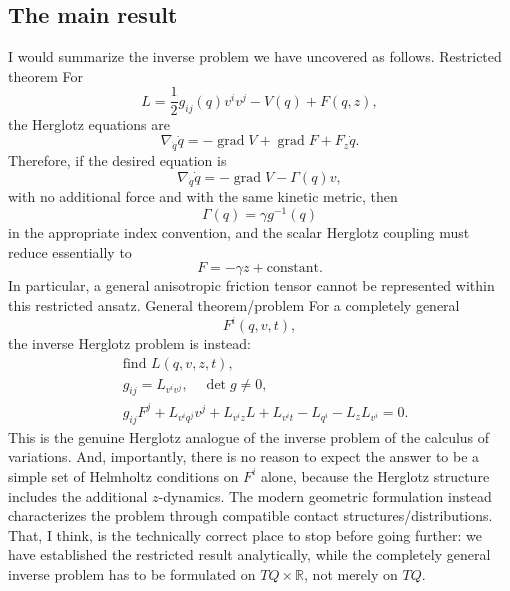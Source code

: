 \subsection{The main result}

I would summarize the inverse problem we have uncovered as follows.
Restricted theorem
For
$$ L= \frac12g_{ij}(q)v^iv^j-V(q)+F(q,z), $$
the Herglotz equations are
\begin{equation}
 \nabla_{\dot q}\dot q = -\operatorname{grad}V + \operatorname{grad}F + F_z\dot q. \tag{50} 
\end{equation}
Therefore, if the desired equation is
\begin{equation}
 \nabla_{\dot q}\dot q = -\operatorname{grad}V - \Gamma(q)v, \tag{51} 
\end{equation}
with no additional force and with the same kinetic metric, then
$$ \boxed{ \Gamma(q)=\gamma g^{-1}(q) } $$
in the appropriate index convention, and the scalar Herglotz coupling must reduce essentially to
$$ F=-\gamma z+\text{constant}. $$
In particular, a general anisotropic friction tensor cannot be represented within this restricted ansatz.
General theorem/problem
For a completely general
$$ F^i(q,v,t), $$
the inverse Herglotz problem is instead:
\begin{equation}
 \boxed{ \begin{aligned} &\text{find }L(q,v,z,t),\\ &g_{ij}=L_{v^iv^j},\quad \det g\neq0,\\ &g_{ij}F^j+ L_{v^iq^j}v^j+ L_{v^iz}L+ L_{v^it} -L_{q^i} -L_zL_{v^i}=0. \end{aligned}} \tag{52} 
\end{equation}
This is the genuine Herglotz analogue of the inverse problem of the calculus of variations.
And, importantly, there is no reason to expect the answer to be a simple set of Helmholtz conditions on \(F^i\) alone, because the Herglotz structure includes the additional \(z\)-dynamics. The modern geometric formulation instead characterizes the problem through compatible contact structures/distributions.
That, I think, is the technically correct place to stop before going further: we have established the restricted result analytically, while the completely general inverse problem has to be formulated on \(TQ\times\mathbb R\), not merely on \(TQ\).
